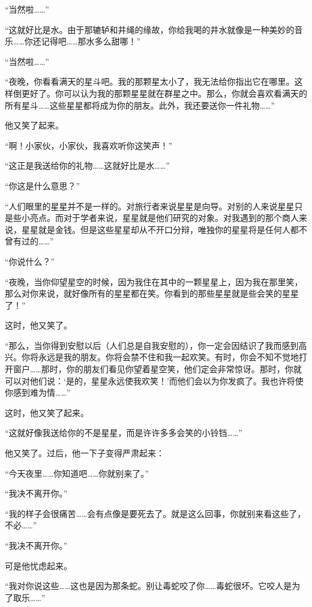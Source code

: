 “当然啦\ldots{}\ldots{}”

“这就好比是水。由于那辘轳和井绳的缘故，你给我喝的井水就像是一种美妙的音乐\ldots{}\ldots{}你还记得吧\ldots{}\ldots{}那水多么甜哪！”

“当然啦\ldots{}\ldots{}”

“夜晚，你看看满天的星斗吧。我的那颗星太小了，我无法给你指出它在哪里。这样倒更好了。你可以认为我的那颗星星就在群星之中。那么，你就会喜欢看满天的所有星斗\ldots{}\ldots{}这些星星都将成为你的朋友。此外，我还要送你一件礼物\ldots{}\ldots{}”

他又笑了起来。

“啊！小家伙，小家伙，我喜欢听你这笑声！”

“这正是我送给你的礼物\ldots{}\ldots{}这就好比是水\ldots{}\ldots{}”

“你这是什么意思？”

“人们眼里的星星并不是一样的。对旅行者来说星星是向导。对别的人来说星星只是些小亮点。而对于学者来说，星星就是他们研究的对象。对我遇到的那个商人来说，星星就是金钱。但是这些星星却从不开口分辩，唯独你的星星将是任何人都不曾有过的\ldots{}\ldots{}”

“你说什么？”

“夜晚，当你仰望星空的时候，因为我住在其中的一颗星星上，因为我在那里笑，那么对你来说，就好像所有的星星都在笑。你看到的那些星星就是些会笑的星星了！”

这时，他又笑了。

“那么，当你得到安慰以后（人们总是自我安慰的），你一定会因结识了我而感到高兴。你将永远是我的朋友。你将会禁不住和我一起欢笑。有时，你会不知不觉地打开窗户\ldots{}\ldots{}那时，你的朋友们看见你望着星空笑，他们定会非常惊讶。那时，你就可以对他们说：‘是的，星星永远使我欢笑！'而他们会以为你发疯了。我也许将使你感到难为情\ldots{}\ldots{}”

这时，他又笑了起来。

“这就好像我送给你的不是星星，而是许许多多会笑的小铃铛\ldots{}\ldots{}”

他又笑了。过后，他一下子变得严肃起来：

“今天夜里\ldots{}\ldots{}你知道吧\ldots{}\ldots{}你就别来了。”

“我决不离开你。”

“我的样子会很痛苦\ldots{}\ldots{}会有点像是要死去了。就是这么回事，你就别来看这些了，不必\ldots{}\ldots{}”

“我决不离开你。”

可是他忧虑起来。

“我对你说这些\ldots{}\ldots{}这也是因为那条蛇。别让毒蛇咬了你\ldots{}\ldots{}毒蛇很坏。它咬人是为了取乐\ldots{}\ldots{}”

